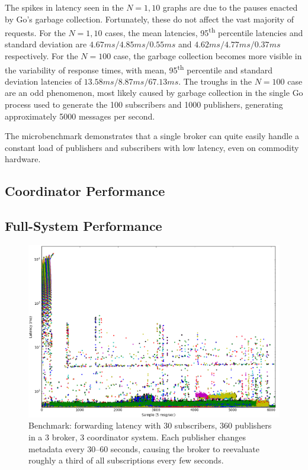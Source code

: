 The spikes in latency seen in the $N=1,10$ graphs are due to the pauses enacted by Go's garbage collection.
Fortunately, these do not affect the vast majority of requests.
For the $N=1,10$ cases, the mean latencies, 95\textsuperscript{th} percentile latencies and standard deviation are $4.67ms/4.85ms/0.55ms$ and $4.62ms/4.77ms/0.37ms$ respectively.
For the $N=100$ case, the garbage collection becomes more visible in the variability of response times, with mean, 95\textsuperscript{th} percentile and standard deviation latencies of $13.58ms/8.87ms/67.13ms$.
The troughs in the $N=100$ case are an odd phenomenon, most likely caused by garbage collection in the single Go process used to generate the 100 subscribers and 1000 publishers, generating approximately 5000 messages per second.

The microbenchmark demonstrates that a single broker can quite easily handle a constant load of publishers and subscribers with low latency, even on commodity hardware.

\subsection{Coordinator Performance}


\subsection{Full-System Performance}

\begin{figure}[t]
\centering
\includegraphics[width=\linewidth]{figs/fullsystem_metadatachange.png}
\caption{Benchmark: forwarding latency with 30 subscribers, 360 publishers in a 3 broker, 3 coordinator system. Each publisher changes metadata every 30--60 seconds, causing the broker to reevaluate roughly a third of all subscriptions every few seconds.}
\label{fig:fullsystem_metadatachange}
\end{figure}

